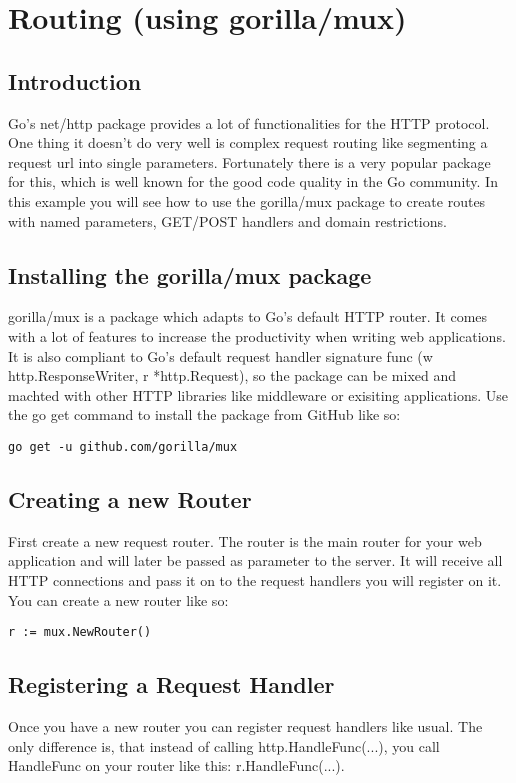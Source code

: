 \section{Routing (using gorilla/mux)}

\subsection{Introduction}

Go’s net/http package provides a lot of functionalities for the HTTP protocol. One thing it doesn’t do very well is complex request routing like segmenting a request url into single parameters. Fortunately there is a very popular package for this, which is well known for the good code quality in the Go community. In this example you will see how to use the gorilla/mux package to create routes with named parameters, GET/POST handlers and domain restrictions.

\subsection{Installing the gorilla/mux package}

gorilla/mux is a package which adapts to Go’s default HTTP router. It comes with a lot of features to increase the productivity when writing web applications. It is also compliant to Go’s default request handler signature func (w http.ResponseWriter, r *http.Request), so the package can be mixed and machted with other HTTP libraries like middleware or exisiting applications. Use the go get command to install the package from GitHub like so:

\begin{lstlisting}[numbers=none]
go get -u github.com/gorilla/mux
\end{lstlisting}

\subsection{Creating a new Router}

First create a new request router. The router is the main router for your web application and will later be passed as parameter to the server. It will receive all HTTP connections and pass it on to the request handlers you will register on it. You can create a new router like so:

\begin{lstlisting}[numbers=none]
r := mux.NewRouter()
\end{lstlisting}

\subsection{Registering a Request Handler}

Once you have a new router you can register request handlers like usual. The only difference is, that instead of calling http.HandleFunc(...), you call HandleFunc on your router like this: r.HandleFunc(...).



